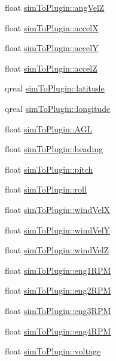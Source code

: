 \begin{DoxyCompactItemize}
float \hyperlink{group___aero_sim_r_c_gaaabca3226ef304ba1333129c54a8c777}{sim\-To\-Plugin\-::ang\-Vel\-Z}
\item 
float \hyperlink{group___aero_sim_r_c_gad96840cb6cfc38f4c4f8d5a907bf7a0a}{sim\-To\-Plugin\-::accel\-X}
\item 
float \hyperlink{group___aero_sim_r_c_gacbcac5da9b87bf7eb091f7a83b3d2fda}{sim\-To\-Plugin\-::accel\-Y}
\item 
float \hyperlink{group___aero_sim_r_c_ga757616fff3384f894b594e9681d39f90}{sim\-To\-Plugin\-::accel\-Z}
\item 
qreal \hyperlink{group___aero_sim_r_c_ga53209d2be245073a24064614cb7c2ce2}{sim\-To\-Plugin\-::latitude}
\item 
qreal \hyperlink{group___aero_sim_r_c_ga3b47af6ee67e1149980bd672fce0f91d}{sim\-To\-Plugin\-::longitude}
\item 
float \hyperlink{group___aero_sim_r_c_gadaa747e1f33381fce539ba3df9915281}{sim\-To\-Plugin\-::\-A\-G\-L}
\item 
float \hyperlink{group___aero_sim_r_c_ga62f831b287508b68a2b0ad45a9d2dc18}{sim\-To\-Plugin\-::heading}
\item 
float \hyperlink{group___aero_sim_r_c_ga2ae727a3d4523188e3b7e5c664c22637}{sim\-To\-Plugin\-::pitch}
\item 
float \hyperlink{group___aero_sim_r_c_ga5ae77c3d47014ab64ef930314843a0fe}{sim\-To\-Plugin\-::roll}
\item 
float \hyperlink{group___aero_sim_r_c_ga28ae11206edb7d479d61f42edfe59a6a}{sim\-To\-Plugin\-::wind\-Vel\-X}
\item 
float \hyperlink{group___aero_sim_r_c_ga4a4ed34bd3c1e67d51b1d5b2272cbf3f}{sim\-To\-Plugin\-::wind\-Vel\-Y}
\item 
float \hyperlink{group___aero_sim_r_c_ga28ceecb62e11bce71b44c63ea4af67aa}{sim\-To\-Plugin\-::wind\-Vel\-Z}
\item 
float \hyperlink{group___aero_sim_r_c_ga92a2016c6887c978c9179cf3bf117c5a}{sim\-To\-Plugin\-::eng1\-R\-P\-M}
\item 
float \hyperlink{group___aero_sim_r_c_ga2fa372d547f9f33642415f454bccf402}{sim\-To\-Plugin\-::eng2\-R\-P\-M}
\item 
float \hyperlink{group___aero_sim_r_c_ga12d0b07a1f43644fa7b16c0b53409ef9}{sim\-To\-Plugin\-::eng3\-R\-P\-M}
\item 
float \hyperlink{group___aero_sim_r_c_gac7d5d72d3237905c99ee5b63859e7df3}{sim\-To\-Plugin\-::eng4\-R\-P\-M}
\item 
float \hyperlink{group___aero_sim_r_c_ga598e987b250d694aeaced9fb921e03bd}{sim\-To\-Plugin\-::voltage}

\end{DoxyCompactItemize}
